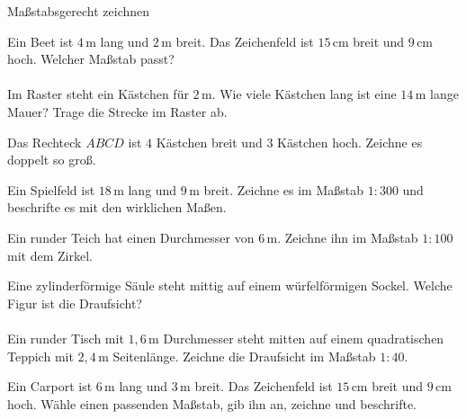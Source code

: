 \begin{aufgabe}{Maßstabsgerecht zeichnen}
\begin{teile}
\teil Ein Beet ist $4\,\text{m}$ lang und $2\,\text{m}$ breit. Das Zeichenfeld ist $15\,\text{cm}$ breit und $9\,\text{cm}$ hoch. Welcher Maßstab passt?  \\  \\ 
\teil Im Raster steht ein Kästchen für $2\,\text{m}$. Wie viele Kästchen lang ist eine $14\,\text{m}$ lange Mauer? Trage die Strecke im Raster ab.

\begin{ksys}[xmin=0,xmax=10,ymin=0,ymax=3]\end{ksys}
\leerfeld[Kästchen]
\teil Das Rechteck $ABCD$ ist $4$ Kästchen breit und $3$ Kästchen hoch. Zeichne es doppelt so groß.

\begin{ksys}[xmin=0,xmax=14,ymin=0,ymax=10]\end{ksys}
\teil Ein Spielfeld ist $18\,\text{m}$ lang und $9\,\text{m}$ breit. Zeichne es im Maßstab $1 : 300$ und beschrifte es mit den wirklichen Maßen.

\begin{ksys}[xmin=0,xmax=10,ymin=0,ymax=6]\end{ksys}
\teil Ein runder Teich hat einen Durchmesser von $6\,\text{m}$. Zeichne ihn im Maßstab $1 : 100$ mit dem Zirkel.

\begin{ksys}[xmin=0,xmax=10,ymin=0,ymax=6]\end{ksys}
\teil Eine zylinderförmige Säule steht mittig auf einem würfelförmigen Sockel. Welche Figur ist die Draufsicht?  \\  \\ 
\teil Ein runder Tisch mit $1{,}6\,\text{m}$ Durchmesser steht mitten auf einem quadratischen Teppich mit $2{,}4\,\text{m}$ Seitenlänge. Zeichne die Draufsicht im Maßstab $1 : 40$.

\begin{ksys}[xmin=0,xmax=10,ymin=0,ymax=6]\end{ksys}
\teil Ein Carport ist $6\,\text{m}$ lang und $3\,\text{m}$ breit. Das Zeichenfeld ist $15\,\text{cm}$ breit und $9\,\text{cm}$ hoch. Wähle einen passenden Maßstab, gib ihn an, zeichne und beschrifte.


\end{teile}
\end{aufgabe}
